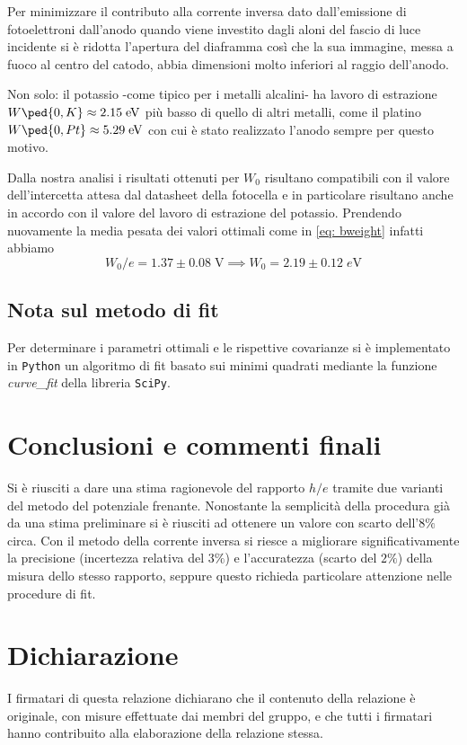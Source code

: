 \documentclass[10pt, a4paper, italian]{article}
\begin{document}
Per minimizzare il contributo alla corrente inversa dato dall'emissione di
fotoelettroni dall'anodo quando viene investito dagli aloni del fascio di
luce incidente si è ridotta l'apertura del diaframma così che la sua
immagine, messa a fuoco al centro del catodo, abbia dimensioni molto
inferiori al raggio dell'anodo.

Non solo: il potassio -come tipico per i metalli alcalini- ha lavoro di
estrazione $W\ped{0, K} \approx 2.15 \; \si{e\V}$ più basso di quello di altri
metalli, come il platino $W\ped{0, Pt} \approx 5.29 \; \si{e\V}$ con cui è
stato realizzato l'anodo sempre per questo motivo.

Dalla nostra analisi i risultati ottenuti per $W_0$ risultano compatibili con
il valore dell'intercetta attesa dal datasheet della fotocella e in
particolare risultano anche in accordo con il valore del lavoro di estrazione
del potassio. Prendendo nuovamente la media pesata dei valori ottimali come in
\cref{eq: bweight} infatti abbiamo
\[
W_0/e = 1.37 \pm 0.08 \; \si{\V} \implies W_0 = 2.19 \pm 0.12 \; \si{e\V}
\]

\subsection{Nota sul metodo di fit}
Per determinare i parametri ottimali e le rispettive covarianze si \`e
implementato in \verb+Python+ un algoritmo di fit basato sui minimi quadrati
mediante la funzione \emph{curve\_fit} della libreria \texttt{SciPy}.

\section*{Conclusioni e commenti finali}
Si è riusciti a dare una stima ragionevole del rapporto $h/e$ tramite due
varianti del metodo del potenziale frenante. Nonostante la semplicità della
procedura già da una stima preliminare si è riusciti ad ottenere un valore
con scarto dell'$8 \%$ circa. Con il metodo della corrente inversa si riesce
a migliorare significativamente la precisione (incertezza relativa del $3 \%$)
e l'accuratezza (scarto del $2 \%$) della misura dello stesso rapporto,
seppure questo richieda particolare attenzione nelle procedure di fit.

\section*{Dichiarazione}
I firmatari di questa relazione dichiarano che il contenuto della relazione \`e
originale, con misure effettuate dai membri del gruppo, e che tutti i firmatari
hanno contribuito alla elaborazione della relazione stessa.
\end{document}
